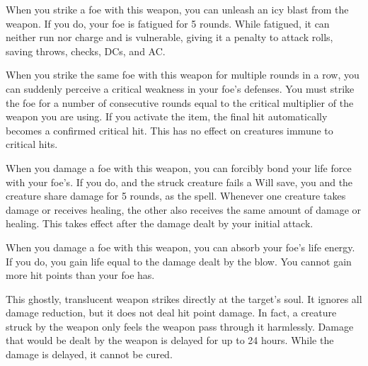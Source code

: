  When you strike a foe with this weapon, you can unleash an icy blast from the weapon. If you do, your foe is fatigued for 5 rounds. While fatigued, it can neither run nor charge and is vulnerable, giving it a  penalty to attack rolls, saving throws, checks, DCs, and AC.


 When you strike the same foe with this weapon for multiple rounds in a row, you can suddenly perceive a critical weakness in your foe's defenses. You must strike the foe for a number of consecutive rounds equal to the critical multiplier of the weapon you are using. If you activate the item, the final hit automatically becomes a confirmed critical hit. This has no effect on creatures immune to critical hits.


 When you damage a foe with this weapon, you can forcibly bond your life force with your foe's. If you do, and the struck creature fails a Will save, you and the creature share damage for 5 rounds, as the  spell. Whenever one creature takes damage or receives healing, the other also receives the same amount of damage or healing. This takes effect after the damage dealt by your initial attack.

 When you damage a foe with this weapon, you can absorb your foe's life energy. If you do, you gain life equal to the damage dealt by the blow. You cannot gain more hit points than your foe has.


 This ghostly, translucent weapon strikes directly at the target's soul. It ignores all damage reduction, but it does not deal hit point damage. In fact, a creature struck by the weapon only feels the weapon pass through it harmlessly. Damage that would be dealt by the weapon is delayed for up to 24 hours. While the damage is delayed, it cannot be cured.

